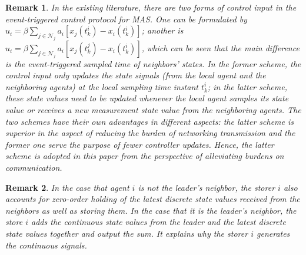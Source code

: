 \documentclass[review]{elsarticle}
\newtheorem{rmk}{Remark}
\begin{document}
\begin{rmk}
	In the existing literature, there are two forms of control input in the event-triggered control protocol for MAS. One can be formulated by $u_i = \beta\sum_{j\in \mathcal{N}_j}a_{i}\left[ x_j(t_k^i) - x_i(t_k^i)\right] $; another is $u_i = \beta\sum_{j\in \mathcal{N}_j}a_{i}\left[ x_j(t_k^j) - x_i(t_k^i)\right] $, which can be seen that the main difference is the event-triggered sampled time of neighbors' states. 
	In the former scheme, the control input only updates the state signals (from the local agent and the neighboring agents) at the local sampling time instant $t^i_k$; 
	in the latter scheme, these state values need to be updated whenever the local agent samples its state value or receives a new measurement state value from the neighboring agents. The two schemes have their own advantages in different aspects: the latter scheme is superior in the aspect of reducing the burden of networking transmission and the former one serve the purpose of fewer controller updates. Hence, the latter scheme is adopted in this paper from the perspective of alleviating burdens on communication.
\end{rmk}

\begin{rmk}
	In the case that agent $i$ is not the leader's neighbor, the storer $i$ also accounts for zero-order holding of the latest discrete state values received from the neighbors as well as storing them. In the case that it is the leader's neighbor, the store $i$ adds the continuous state values from the leader and the latest discrete state values together and output the sum. It explains why the storer $i$ generates the continuous signals.  
\end{rmk}
\end{document}
